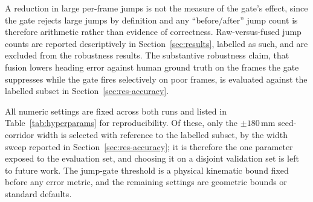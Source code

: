 A reduction in large per-frame jumps is not the measure of the gate's effect, since the gate rejects large
jumps by definition and any ``before/after'' jump count is therefore arithmetic rather than evidence of
correctness. Raw-versus-fused jump counts are reported descriptively in Section~\ref{sec:results}, labelled
as such, and are excluded from the robustness results. The substantive robustness claim, that fusion lowers
heading error against human ground truth on the frames the gate suppresses while the gate fires selectively
on poor frames, is evaluated against the labelled subset in Section~\ref{sec:res-accuracy}.

All numeric settings are fixed across both runs and listed in Table~\ref{tab:hyperparams} for reproducibility.
Of these, only the $\pm180$\,mm seed-corridor width is selected with reference to the labelled subset, by the
width sweep reported in Section~\ref{sec:res-accuracy}; it is therefore the one parameter exposed to the
evaluation set, and choosing it on a disjoint validation set is left to future work. The jump-gate threshold
is a physical kinematic bound fixed before any error metric, and the remaining settings are geometric bounds
or standard defaults.

